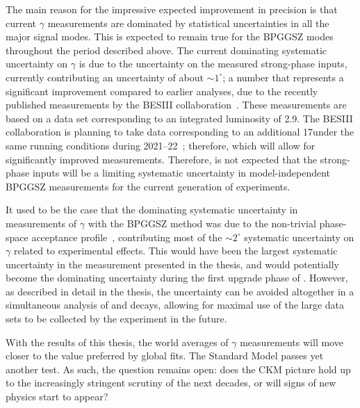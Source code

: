 The main reason for the impressive expected improvement in precision is that current $\gamma$ measurements are dominated by statistical uncertainties in all the major signal modes. This is expected to remain true for the BPGGSZ modes throughout the period described above. The current dominating systematic uncertainty on $\gamma$ is due to the uncertainty on the measured strong-phase inputs, currently contributing an uncertainty of about $\sim1^\circ$; a number that represents a significant improvement compared to earlier analyses, due to the recently published measurements by the BESIII collaboration~\cite{BESCISI,BESCISIKSKK}. These measurements are based on a data set corresponding to an integrated luminosity of 2.9\invfb. The BESIII collaboration is planning to take data corresponding to an additional 17\invfb under the same running conditions during 2021--22~\cite{BESTimescale}; therefore, which will allow for significantly improved measurements. Therefore, is not expected that the strong-phase inputs will be a limiting systematic uncertainty in model-independent BPGGSZ measurements for the current generation of experiments. 

It used to be the case that the dominating systematic uncertainty in \lhcb measurements of $\gamma$ with the BPGGSZ method was due to the non-trivial phase-space acceptance profile~\cite{LHCb-PAPER-2018-017}, contributing most of the $\sim2^\circ$ systematic uncertainty on $\gamma$ related to experimental effects. This would have been the largest systematic uncertainty in the measurement presented in the thesis, and would potentially become the dominating uncertainty during the first upgrade phase of \lhcb. However, as described in detail in the thesis, the uncertainty can be avoided altogether in a simultaneous analysis of \BtoDK and \BtoDpi decays, allowing for maximal use of the large data sets to be collected by the \lhcb experiment in the future.

With the results of this thesis, the world averages of $\gamma$ measurements will move closer to the value preferred by global fits. The Standard Model passes yet another test. As such, the question remains open: does the CKM picture hold up to the increasingly stringent scrutiny of the next decades, or will signs of new physics start to appear?





